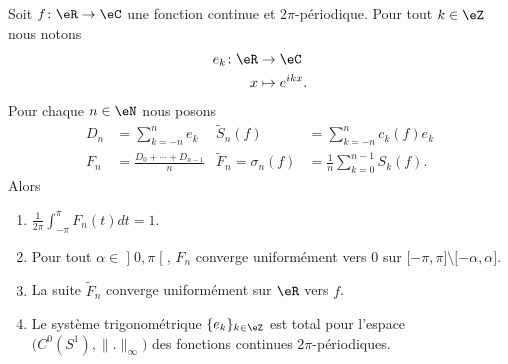 \begin{theorem}[Fejèr]      \label{ThoJFqczow}
    Soit \( f\colon \eR\to \eC\) une fonction continue et \( 2\pi\)-périodique. Pour tout \( k\in \eZ\) nous notons
    \begin{equation}
        \begin{aligned}
            e_k\colon \eR&\to \eC \\
            x&\mapsto  e^{ikx}.
        \end{aligned}
    \end{equation}
    Pour chaque \( n\in \eN\) nous posons
    \begin{subequations}
        \begin{align}
            D_n&=\sum_{k=-n}^ne_k& \tilde S_n(f)&=\sum_{k=-n}^nc_k(f)e_k\\
            F_n&=\frac{  D_0+\cdots + D_{n-1} }{ n }&  \tilde F_n=\sigma_n(f)&=\frac{1}{ n }\sum_{k=0}^{n-1}S_k(f).
        \end{align}
    \end{subequations}
    Alors
    \begin{enumerate}
        \item
            $\frac{1}{ 2\pi }\int_{-\pi}^{\pi}F_n(t)dt=1$.
        \item
            Pour tout \( \alpha\in \mathopen] 0 , \pi \mathclose[\), \( F_n\) converge uniformément vers \( 0\) sur \( \mathopen[ -\pi , \pi \mathclose]\setminus\mathopen[ -\alpha , \alpha \mathclose]\).
        \item
            La suite \( \tilde F_n \) converge uniformément sur \( \eR\) vers \( f\).
        \item   \label{ItemUNQSPmyiv}
            Le système trigonométrique \( \{ e_k \}_{k\in\eZ}\) est total pour l'espace \( \big( C^0(S^1),\| . \|_{\infty} \big)\) des fonctions continues \( 2\pi\)-périodiques.
    \end{enumerate}
\end{theorem}

